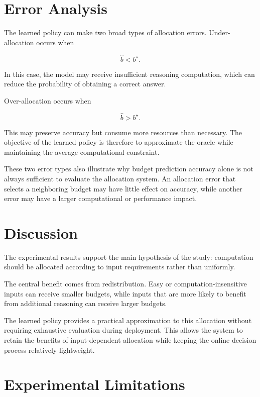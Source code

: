 \documentclass[12pt,a4paper,titlepage]{report}
\begin{document}
\section{Error Analysis}

The learned policy can make two broad types of allocation errors. Under-allocation occurs when

\begin{equation}
\hat{b}<b^\star.
\end{equation}

In this case, the model may receive insufficient reasoning computation, which can reduce the probability of obtaining a correct answer.

Over-allocation occurs when

\begin{equation}
\hat{b}>b^\star.
\end{equation}

This may preserve accuracy but consume more resources than necessary. The objective of the learned policy is therefore to approximate the oracle while maintaining the average computational constraint.

These two error types also illustrate why budget prediction accuracy alone is not always sufficient to evaluate the allocation system. An allocation error that selects a neighboring budget may have little effect on accuracy, while another error may have a larger computational or performance impact.

\section{Discussion}

The experimental results support the main hypothesis of the study: computation should be allocated according to input requirements rather than uniformly.

The central benefit comes from redistribution. Easy or computation-insensitive inputs can receive smaller budgets, while inputs that are more likely to benefit from additional reasoning can receive larger budgets.

The learned policy provides a practical approximation to this allocation without requiring exhaustive evaluation during deployment. This allows the system to retain the benefits of input-dependent allocation while keeping the online decision process relatively lightweight.

\section{Experimental Limitations}
\end{document}
